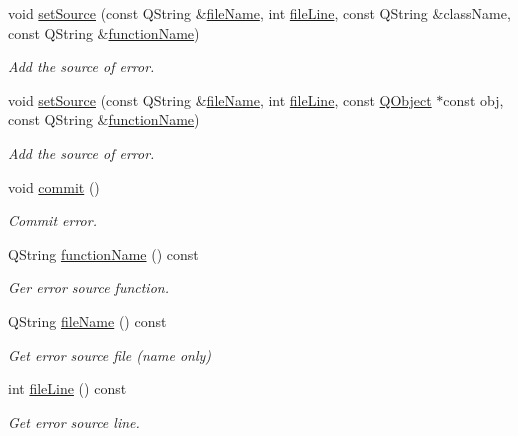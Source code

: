 \begin{DoxyCompactItemize}
void \hyperlink{class_mdt_1_1_error_a785bdfbb360e3a29a465a9baeb1ac58b}{set\+Source} (const Q\+String \&\hyperlink{class_mdt_1_1_error_a5f7cdab03c2c0955693ace234039cd53}{file\+Name}, int \hyperlink{class_mdt_1_1_error_a5b887edc31341eb23557905e7a2d69ae}{file\+Line}, const Q\+String \&class\+Name, const Q\+String \&\hyperlink{class_mdt_1_1_error_a5706a74669219d9672ee20414f805cab}{function\+Name})
\begin{DoxyCompactList}\small\item\em Add the source of error. \end{DoxyCompactList}\item 
void \hyperlink{class_mdt_1_1_error_a38d1fb6f1d17a4a3d483ea367bdcb416}{set\+Source} (const Q\+String \&\hyperlink{class_mdt_1_1_error_a5f7cdab03c2c0955693ace234039cd53}{file\+Name}, int \hyperlink{class_mdt_1_1_error_a5b887edc31341eb23557905e7a2d69ae}{file\+Line}, const \hyperlink{class_q_object}{Q\+Object} $\ast$const obj, const Q\+String \&\hyperlink{class_mdt_1_1_error_a5706a74669219d9672ee20414f805cab}{function\+Name})
\begin{DoxyCompactList}\small\item\em Add the source of error. \end{DoxyCompactList}\item 
void \hyperlink{class_mdt_1_1_error_a1b4a57bd4177d2985abd62b6b49a43f8}{commit} ()
\begin{DoxyCompactList}\small\item\em Commit error. \end{DoxyCompactList}\item 
Q\+String \hyperlink{class_mdt_1_1_error_a5706a74669219d9672ee20414f805cab}{function\+Name} () const 
\begin{DoxyCompactList}\small\item\em Ger error source function. \end{DoxyCompactList}\item 
Q\+String \hyperlink{class_mdt_1_1_error_a5f7cdab03c2c0955693ace234039cd53}{file\+Name} () const 
\begin{DoxyCompactList}\small\item\em Get error source file (name only) \end{DoxyCompactList}\item 
int \hyperlink{class_mdt_1_1_error_a5b887edc31341eb23557905e7a2d69ae}{file\+Line} () const 
\begin{DoxyCompactList}\small\item\em Get error source line. \end{DoxyCompactList}\end{DoxyCompactItemize}
